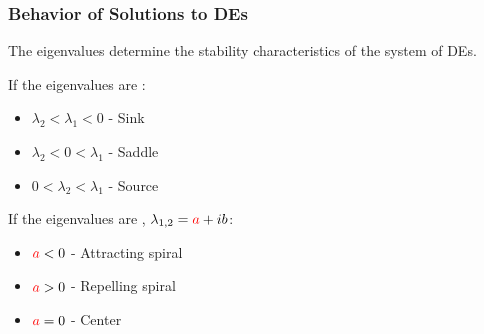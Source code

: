 \begin{frame}
  \frametitle{Behavior of Solutions to DEs}

  The eigenvalues determine the stability characteristics of the
  system of DEs.

  If the eigenvalues are :
  \begin{itemize}
  \item $\lambda_2 < \lambda_1 < 0$ - Sink
  \item $\lambda_2 < 0 < \lambda_1$ - Saddle
  \item $0 < \lambda_2 < \lambda_1$ - Source
  \end{itemize}

  If the eigenvalues are , $\lambda_{1,2}={\color{red}a}+ib$:
  \begin{itemize}
  \item ${\color{red}a}<0$ - Attracting spiral
  \item ${\color{red}a}>0$ - Repelling spiral
  \item ${\color{red}a}=0$ - Center
  \end{itemize}

\end{frame}

